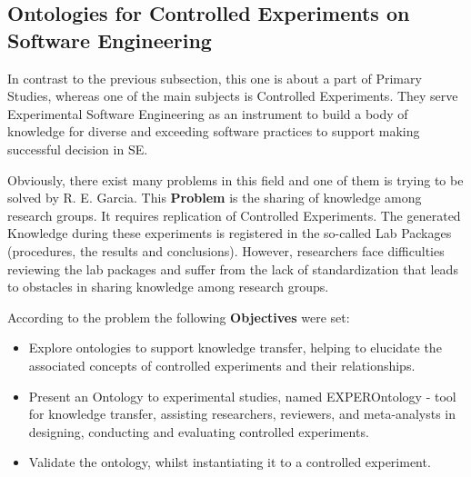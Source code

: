 	
	\subsection{Ontologies for Controlled Experiments on Software Engineering}
	
	In contrast to the previous subsection, this one is about a part of Primary Studies, whereas one of the main subjects is Controlled Experiments. They serve Experimental Software Engineering as an instrument to build a body of knowledge for diverse and exceeding software practices to support making successful decision in SE.
	
	Obviously, there exist many problems in this field and one of them is trying to be solved by R. E. Garcia\cite{Gar08}. This \textbf{Problem} is the sharing of knowledge among research groups. It requires replication of Controlled Experiments. The generated Knowledge during these experiments is registered in the so-called Lab Packages (procedures, the results and conclusions). However, researchers face difficulties reviewing the lab packages and suffer from the lack of standardization that leads to obstacles in sharing knowledge among research groups. 
	
	According to the problem the following \textbf{Objectives} were set:
		\begin{itemize}
			\item Explore ontologies to support knowledge transfer,
			helping to elucidate the associated concepts of controlled
			experiments and their relationships.
			\item Present an Ontology to experimental studies, named EXPEROntology - tool
			for knowledge transfer, assisting researchers, reviewers,
			and meta-analysts in designing, conducting and evaluating
			controlled experiments.
			\item Validate the ontology, whilst instantiating it to a controlled experiment.
		\end{itemize}
	  
